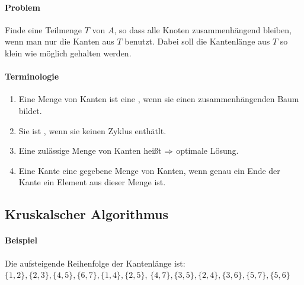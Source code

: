 \documentclass[a4paper]{scrartcl}
\begin{document}




\paragraph{Problem}
Finde eine Teilmenge $T$ von $A$, so dass alle Knoten zusammenhängend bleiben,
wenn man nur die Kanten aus $T$ benutzt. Dabei soll die Kantenlänge aus $T$ so
klein wie möglich gehalten werden. \\


\paragraph{Terminologie}
\begin{enumerate}
\item Eine Menge von Kanten ist eine , wenn sie einen zusammenhängenden
Baum bildet.
\item Sie ist , wenn sie keinen Zyklus enthätlt.
\item Eine zulässige Menge von Kanten heißt  $\Rightarrow$ optimale Lösung.
\item Eine Kante  eine gegebene Menge von Kanten, wenn genau ein Ende der
Kante ein Element aus dieser Menge ist.
\end{enumerate}

\subsection{Kruskalscher Algorithmus}
\paragraph{Beispiel}
Die aufsteigende Reihenfolge der Kantenlänge ist: \\
$\{1,2\},\{2,3\},\{4,5\},\{6,7\},\{1,4\},\{2,5\}$,
$\{4,7\},\{3,5\},\{2,4\},\{3,6\},\{5,7\},\{5,6\}$ \\ \\
\end{document}
